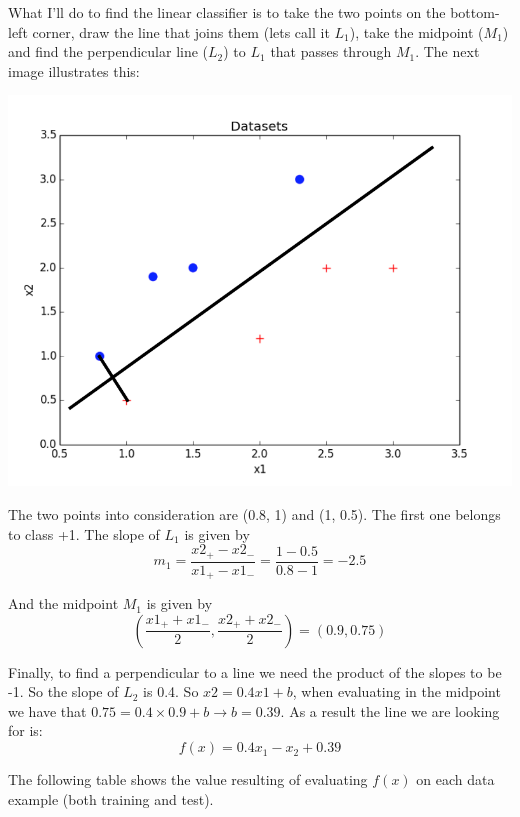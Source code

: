 \documentclass[11pt]{article}
\begin{document}
What I'll do to find the linear classifier is to take the two points on the bottom-left corner, draw the line that joins them (lets call it $L_1$), take the midpoint ($M_1$) and find the perpendicular line ($L_2$) to $L_1$ that passes through $M_1$. The next image illustrates this:
\begin{center}
\includegraphics[scale=0.75]{q2-dataplot.png}
\end{center}

The two points into consideration are (0.8, 1) and (1, 0.5). The first one belongs to class +1. The slope of $L_1$ is given by 
\[ m_1 = \frac{x2_+ - x2_-}{x1_+ - x1_-} = \frac{1 - 0.5}{0.8 - 1} = -2.5 \]

And the midpoint $M_1$ is given by
\[ (\frac{x1_+ + x1_-}{2}, \frac{x2_+ + x2_-}{2}) = (0.9, 0.75) \]

Finally, to find a perpendicular to a line we need the product of the slopes to be -1. So the slope of $L_2$ is 0.4. So $x2 = 0.4x1 + b$, when evaluating in the midpoint we have that $0.75 = 0.4\times 0.9 + b \rightarrow b = 0.39 $. As a result the line we are looking for is:
\[ f(x) = 0.4x_1 - x_2 + 0.39 \]

The following table shows the value resulting of evaluating $f(x)$ on each data example (both training and test).
\end{document}

